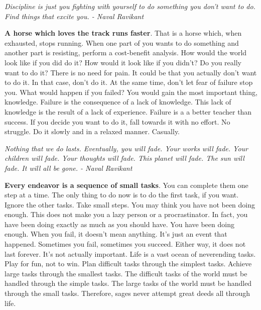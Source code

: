 \documentclass[a4paper,hidelinks]{article}
\begin{document}
\begin{center}
\textit{Discipline is just you fighting with yourself to do something you don't want to do. Find things that excite you. - Naval Ravikant}
\end{center}

\textbf{A horse which loves the track runs faster}.
That is a horse which, when exhausted, stops running.
When one part of you wants to do something and another part is resisting, perform a cost-benefit analysis.
How would the world look like if you did do it?
How would it look like if you didn't?
Do you really want to do it?
There is no need for pain.
It could be that you actually don't want to do it.
In that case, don't do it.
At the same time, don't let fear of failure stop you.
What would happen if you failed?
You would gain the most important thing, knowledge.
Failure is the consequence of a lack of knowledge.
This lack of knowledge is the result of a lack of experience.
Failure is a a better teacher than success.
If you decide you want to do it, fall towards it with no effort.
No struggle.
Do it slowly and in a relaxed manner.
Casually.

\newpage

\begin{center}
\textit{Nothing that we do lasts. Eventually, you will fade. Your works will fade. Your children will fade. Your thoughts will fade. This planet will fade. The sun will fade. It will all be gone. - Naval Ravikant}
\end{center}

\textbf{Every endeavor is a sequence of small tasks}.
You can complete them one step at a time.
The only thing to do now is to do the first task, if you want.
Ignore the other tasks.
Take small steps.
You may think you have not been doing enough.
This does not make you a lazy person or a procrastinator.
In fact, you have been doing exactly as much as you should have.
You have been doing enough.
When you fail, it doesn't mean anything.
It's just an event that happened.
Sometimes you fail, sometimes you succeed.
Either way, it does not last forever.
It's not actually important.
Life is a vast ocean of neverending tasks.
Play for fun, not to win.
Plan difficult tasks through the simplest tasks.
Achieve large tasks through the smallest tasks.
The difficult tasks of the world must be handled through the simple tasks.
The large tasks of the world must be handled through the small tasks.
Therefore, sages never attempt great deeds all through life.

\newpage
\end{document}
